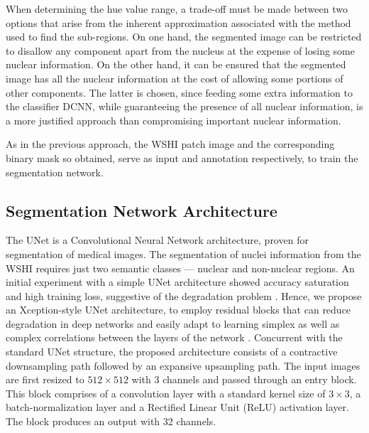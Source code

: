 \documentclass{comjnl}
\begin{document}
When determining the hue value range, a trade-off must be made between two options that arise from the inherent approximation associated with the method used to find the sub-regions. On one hand, the segmented image can be restricted to disallow any component apart from the nucleus at the expense of losing some nuclear information. On the other hand, it can be ensured that the segmented image has all the nuclear information at the cost of allowing some portions of other components. The latter is chosen, since feeding some extra information to the classifier DCNN, while guaranteeing the presence of all nuclear information, is a more justified approach than compromising important nuclear information.

As in the previous approach, the WSHI patch image and the corresponding binary mask so obtained, serve as input and annotation respectively, to train the segmentation network. 

\subsection{Segmentation Network Architecture}

The UNet \cite{jonathan} is a Convolutional Neural Network architecture, proven for segmentation of medical images. The segmentation of nuclei information from the WSHI requires just two semantic classes --- nuclear and non-nuclear regions. An initial experiment with a simple UNet architecture showed accuracy saturation and high training loss, suggestive of the degradation problem \cite{kaiming}. Hence, we propose an Xception-style \cite{chollet} UNet architecture, to employ residual blocks that can reduce degradation in deep networks and easily adapt to learning simplex as well as complex correlations between the layers of the network \cite{veit}. Concurrent with the standard UNet structure, the proposed architecture consists of a contractive downsampling path followed by an expansive upsampling path. The input images are first resized to $512\times512$ with 3 channels and passed through an entry block. This block comprises of a convolution layer with a standard kernel size of $3\times3$, a batch-normalization layer and a Rectified Linear Unit (ReLU) activation layer. The block produces an output with 32 channels.
 
\end{document}
